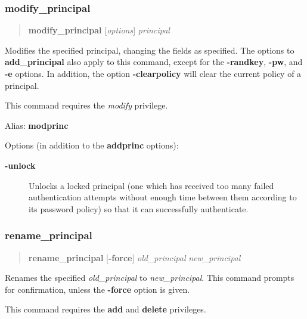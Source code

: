 \documentclass[letterpaper,10pt,english]{sphinxmanual}
\begin{document}
\subsubsection{modify\_principal}
\label{admin/admin_commands/kadmin_local:add-principal-end}\label{admin/admin_commands/kadmin_local:id2}\label{admin/admin_commands/kadmin_local:modify-principal}\begin{quote}

\textbf{modify\_principal} {[}\emph{options}{]} \emph{principal}
\end{quote}

Modifies the specified principal, changing the fields as specified.
The options to \textbf{add\_principal} also apply to this command, except
for the \textbf{-randkey}, \textbf{-pw}, and \textbf{-e} options.  In addition, the
option \textbf{-clearpolicy} will clear the current policy of a principal.

This command requires the \emph{modify} privilege.

Alias: \textbf{modprinc}

Options (in addition to the \textbf{addprinc} options):
\begin{description}
\item[{\textbf{-unlock}}] \leavevmode
Unlocks a locked principal (one which has received too many failed
authentication attempts without enough time between them according
to its password policy) so that it can successfully authenticate.

\end{description}
\label{admin/admin_commands/kadmin_local:modify-principal-end}

\subsubsection{rename\_principal}
\label{admin/admin_commands/kadmin_local:modify-principal-end}\label{admin/admin_commands/kadmin_local:rename-principal}\label{admin/admin_commands/kadmin_local:id3}\begin{quote}

\textbf{rename\_principal} {[}\textbf{-force}{]} \emph{old\_principal} \emph{new\_principal}
\end{quote}

Renames the specified \emph{old\_principal} to \emph{new\_principal}.  This
command prompts for confirmation, unless the \textbf{-force} option is
given.

This command requires the \textbf{add} and \textbf{delete} privileges.
\end{document}
